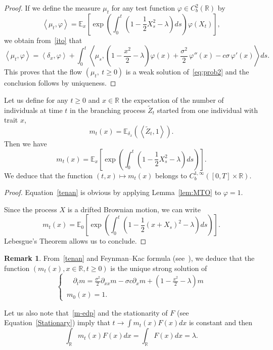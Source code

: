 \documentclass[10pt]{amsart}
\theoremstyle{definition}\newtheorem{defi}[theo]{Definition}\newtheorem{rema}[theo]{Remark}\newtheorem{exam}[theo]{Example}\newtheorem{exem}[theo]{Example}\newtheorem{nota}[theo]{Notation}
\newcommand*\R{\mathbb{R}}
\newcommand*\E{\mathbb{E}}
\newtheorem*{rema*}{Remark}\newtheorem{case}[theo]{Case}
\begin{document}
\begin{proof}
If we define the measure $\mu_{t}$ for any test function $\varphi\in C^2_b(\R)$ by
\[
\left\langle \mu_{t}, \varphi\right\rangle = \E_{x}\left[\exp\left(\int_{0}^{t} \left(1-\frac{1}{2}X_{s}^{2}-\lambda \right)ds \right)\varphi\left(X_{t}\right) \right],
\]
we obtain from~\eqref{ito} that
\[
\left\langle \mu_{t}, \varphi\right\rangle = \left\langle \delta_{x}, \varphi\right\rangle +\int_{0}^t \left\langle \mu_{s}, \left(1-\frac{x^2}{2} -\lambda\right)\varphi(x) + \frac{\sigma^2}{2}\,\varphi''(x)- c \sigma\,\varphi'(x)\right\rangle ds.
\]
This proves that the flow $(\mu_{t},\ t\ge 0)$ is a weak solution of~\eqref{eq:prob2} and the conclusion follows by uniqueness.
\end{proof}


\begin{coro}\label{avril}
Let us define for any $t\ge 0$ and $x\in \R$ the expectation of the number of individuals at time $t$ in the branching process $\widetilde{Z}_t$ started from one individual with trait $x$,
\begin{equation}\label{m}
m_{t}(x) = \E_{\delta_{x}} \left(\left\langle \widetilde{Z}_{t}, 1\right\rangle\right).
\end{equation}
Then we have
\begin{equation}\label{tenan}
m_{t}(x) = \E_{x}\left[\exp\left(\int_{0}^{t} \left(1-\frac{1}{2}X_{s}^{2}-\lambda \right)ds \right) \right].
\end{equation}
We deduce that the function $(t,x)\mapsto m_t(x)$ belongs to $C_{b}^{1, \infty}([0,T]\times \R)$.
\end{coro}


\begin{proof}
Equation~\eqref{tenan} is obvious by applying Lemma~\ref{lem:MTO} to $\varphi=1$.

Since the process $X$ is a drifted Brownian motion, we can write
\[
m_{t}(x) = \E_{0}\left[\exp\left(\int_{0}^{t} \left(1-\frac{1}{2}\left(x+X_{s}\right)^{2}-\lambda \right)ds \right) \right].
\]
Lebesgue's Theorem allows us to conclude.
\end{proof}


\begin{rema*} 
From~\eqref{tenan} and Feynman--Kac formula (see~\cite{feynman_space-time_1948,kac_distributions_1949,kac_connections_1951}), we deduce that the function $(m_{t}(x), x\in \R, t\ge 0)$ is the unique strong solution of
\begin{equation}\label{m-edp}
\begin{cases}
\;\;\;\:\partial_{t} m=\frac{\sigma^2}{2}\partial_{xx}m-\sigma c\partial_{x}m+\left(1-\frac{x^2}{2}-\lambda\right)m\\
\,m_{0}(x)=1.
\end{cases}
\end{equation}


Let us also note that~\eqref{m-edp} and the stationarity of $F$ (see Equation~\eqref{Stationary}) imply that $t\to \int m_{t}(x) F(x) dx$ is constant and then
\begin{equation}\label{mF}
\int_{\R} m_{t}(x) F(x) dx = \int_{\R} F(x) dx = \lambda.
\end{equation}
\end{rema*}
\end{document}
